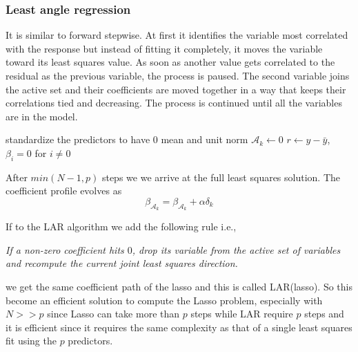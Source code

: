\subsubsection{Least angle regression}
It is similar to forward stepwise. At first it identifies the variable most correlated with the response but instead of fitting it completely, it moves the variable toward its least squares value. As soon as another value gets correlated to the residual as the previous variable, the process is paused. The second variable joins the active set and their coefficients are moved together in a way that keeps their correlations tied and decreasing. The process is continued until all the variables are in the model.
\begin{algorithm}[!ht]
standardize the predictors to have $0$ mean and unit norm\;
$\mathcal{A}_k\leftarrow 0$\;
$r\leftarrow y-\bar{y}$, $\beta_i=0$ for $i\ne0$\;
\end{algorithm}
After $min(N-1,p)$ steps we we arrive at the full least squares solution.
The coefficient profile evolves as
\begin{equation}
\beta_{\mathcal{A}_k} =  \beta_{\mathcal{A}_k} + \alpha \delta_k
\end{equation}

If to the LAR algorithm we add the following rule i.e.,

\textit{If a non-zero coefficient hits $0$, drop its variable from the active set of variables and recompute the current joint least squares direction.}

we get the same coefficient path of the lasso and this is called LAR(lasso). So this become an efficient solution to compute the Lasso problem, especially with $N>>p$ since Lasso can take more than $p$ steps while LAR require $p$ steps and it is efficient since it requires the same complexity as that of a single least squares fit using the $p$ predictors.

